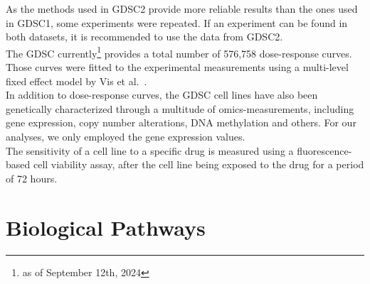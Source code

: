As the methods used in GDSC2 provide more reliable results than the ones used in GDSC1, some experiments were repeated. If an experiment can be found in both datasets, it is recommended to use the data from GDSC2.\\
The GDSC currently\footnote{as of September 12th, 2024} provides a total number of 576,758 dose-response curves. Those curves were fitted to the experimental measurements using a multi-level fixed effect model by Vis et al.~\cite{fixed_effect_model}.\\
In addition to dose-response curves, the GDSC cell lines have also been genetically characterized through a multitude of omics-measurements, including gene expression, copy number alterations, DNA methylation and others. For our analyses, we only employed the gene expression values.\\
The sensitivity of a cell line to a specific drug is measured using a fluorescence-based cell viability assay, after the cell line being exposed to the drug for a period of 72 hours.

\section{Biological Pathways}\label{sec:pws}

